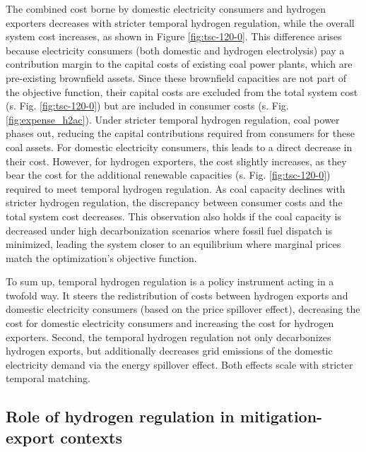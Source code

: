 \documentclass[5p,numafflabel]{elsarticle}
\newcommand{\co}{\ce{CO2}~}
\def\co{CO${}_2${\:}}
\begin{document}
The combined cost borne by domestic electricity consumers and hydrogen exporters decreases with stricter temporal hydrogen regulation, while the overall system cost increases, as shown in Figure \ref{fig:tsc-120-0}. 
This difference arises because electricity consumers (both domestic and hydrogen electrolysis) pay a contribution margin to the capital costs of existing coal power plants, which are pre-existing brownfield assets. Since these brownfield capacities are not part of the objective function, their capital costs are excluded from the total system cost (s. Fig. \ref{fig:tsc-120-0}) but are included in consumer costs (s. Fig. \ref{fig:expense_h2ac}).
Under stricter temporal hydrogen regulation, coal power phases out, reducing the capital contributions required from consumers for these coal assets. For domestic electricity consumers, this leads to a direct decrease in their cost. However, for hydrogen exporters, the cost slightly increases, as they bear the cost for the additional renewable capacities (s. Fig. \ref{fig:tsc-120-0}) required to meet temporal hydrogen regulation. As coal capacity declines with stricter hydrogen regulation, the discrepancy between consumer costs and the total system cost decreases. This observation also holds if the coal capacity is decreased under high decarbonization scenarios where fossil fuel dispatch is minimized, leading the system closer to an equilibrium where marginal prices match the optimization’s objective function.



To sum up, temporal hydrogen regulation is a policy instrument acting in a twofold way. It steers the redistribution of costs between hydrogen exports and domestic electricity consumers (based on the price spillover effect), decreasing the cost for domestic electricity consumers and increasing the cost for hydrogen exporters. 
Second, the temporal hydrogen regulation 
not only decarbonizes hydrogen exports, but additionally decreases grid emissions of the domestic electricity demand via the energy spillover effect. Both effects scale with stricter temporal matching.



\subsection*{Role of hydrogen regulation in mitigation-export contexts}
\label{subsec:rule_all}
\end{document}
